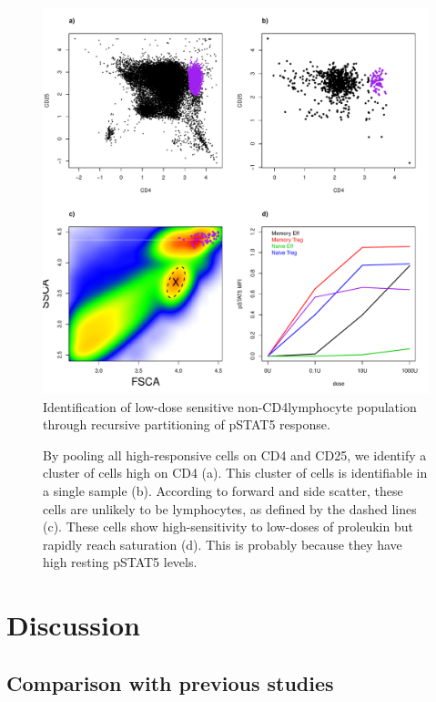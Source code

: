 \hspace{-2cm}
\begin{figure}[h]
\centering
\includegraphics[scale=.5]{IL2/figures/new-cell-subset.pdf}
{ Identification of low-dose sensitive non-CD4\positive lymphocyte population through recursive partitioning of pSTAT5 response. }
{
  By pooling all high-responsive cells on CD4 and CD25, we identify a cluster of cells high on CD4 (a).
  This cluster of cells is identifiable in a single sample (b).
  According to forward and side scatter, these cells are unlikely to be lymphocytes, as defined by the dashed lines (c).
  These cells show high-sensitivity to low-doses of proleukin but rapidly reach saturation (d).
  This is probably because they have high resting pSTAT5 levels.
  
}
\end{figure}




\section{Discussion}

\subsection{Comparison with previous studies}


